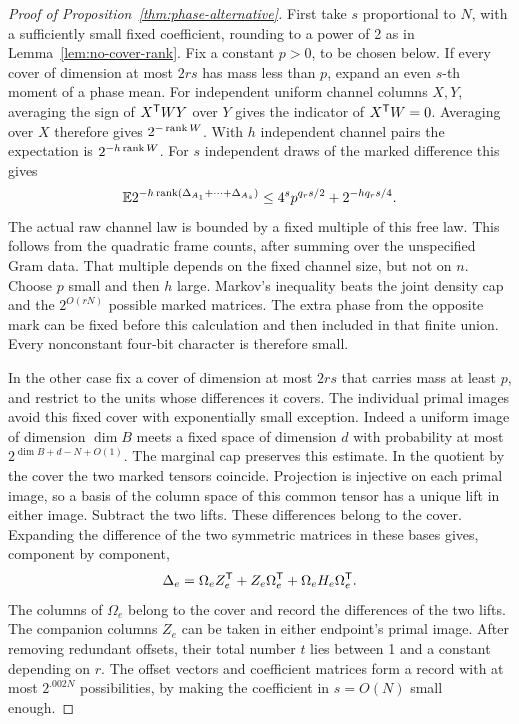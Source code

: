 \begin{proof}[Proof of Proposition~\ref{thm:phase-alternative}]
First take \(s\) proportional to \(N\), with a sufficiently small fixed
coefficient, rounding to a power of 2 as in Lemma~\ref{lem:no-cover-rank}.
Fix a constant \(p>0\), to be chosen below. If every cover of dimension
at most \(2rs\) has mass less than \(p\), expand an even \(s\)-th moment of a phase mean. For independent uniform channel columns \(X,Y\), averaging the sign of
\(X^{\mathsf T} WY\) over \(Y\) gives the indicator of \(X^{\mathsf T} W=0\).
Averaging over \(X\) therefore gives \(2^{-\operatorname{rank} W}\). With \(h\)
independent channel pairs the expectation is \(2^{-h\operatorname{rank} W}\).
For \(s\) independent draws of the marked difference this gives
\[
 \mathbb E 2^{-h\operatorname{rank}(\Delta_{A_1}+\cdots+\Delta_{A_s})}
 \le4^sp^{q_rs/2}+2^{-hq_rs/4}.
\]
The actual raw channel law is bounded by a fixed multiple of this free
law. This follows from the quadratic frame counts, after summing over the
unspecified Gram data. That multiple depends on the fixed channel size,
but not on \(n\).
Choose \(p\) small and then \(h\) large. Markov's inequality beats the
joint density cap and the \(2^{O(rN)}\) possible marked matrices. The
extra phase from the opposite mark can be fixed before this calculation
and then included in that finite union. Every nonconstant four-bit
character is therefore small.

In the other case fix a cover of dimension at most \(2rs\) that carries
mass at least \(p\), and restrict to the units whose differences it covers. The individual primal images avoid this fixed cover with
exponentially small exception. Indeed a uniform image of dimension
\(\dim B\) meets a fixed space of dimension \(d\) with probability
at most \(2^{\dim B+d-N+O(1)}\). The marginal cap preserves this estimate.
In the quotient by the cover the two marked tensors coincide. Projection
is injective on each primal image, so a basis of the column space of
this common tensor has a unique lift in either image. Subtract the two
lifts. These differences belong to the cover. Expanding the difference
of the two symmetric matrices in these bases gives, component by
component,
\begin{equation}\label{eq:symmetric-offsets}
 \Delta_e=\Omega_eZ_e^{\mathsf T}+Z_e\Omega_e^{\mathsf T}+
                \Omega_eH_e\Omega_e^{\mathsf T}.
\end{equation}
The columns of \(\Omega_e\) belong to the cover and record the differences
of the two lifts. The companion columns \(Z_e\) can be taken in either
endpoint's primal image. After removing redundant offsets, their total
number \(t\) lies between 1 and a constant depending on \(r\).
The offset vectors and coefficient matrices form a record with at most
\(2^{.002N}\) possibilities, by making the coefficient in \(s=O(N)\)
small enough.


\end{proof}
